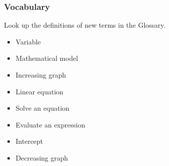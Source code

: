 \documentclass[10pt,]{book}
\theoremstyle{plain}
\theoremstyle{definition}
\theoremstyle{definition}
\theoremstyle{definition}
\numberwithin{equation}{part}
\begin{document}
\subsubsection[{Vocabulary}]{Vocabulary}\label{subsubsection-1}
Look up the definitions of new terms in the Glossary. \leavevmode%
\begin{multicols}{3}
\begin{itemize}[label=\textbullet]
\item{}Variable%
\item{}Mathematical model%
\item{}Increasing graph%
\item{}Linear equation%
\item{}Solve an equation%
\item{}Evaluate an expression%
\item{}Intercept%
\item{}Decreasing graph%
\end{itemize}
\end{multicols}
%
\typeout{************************************************}
\typeout{************************************************}
\end{document}
